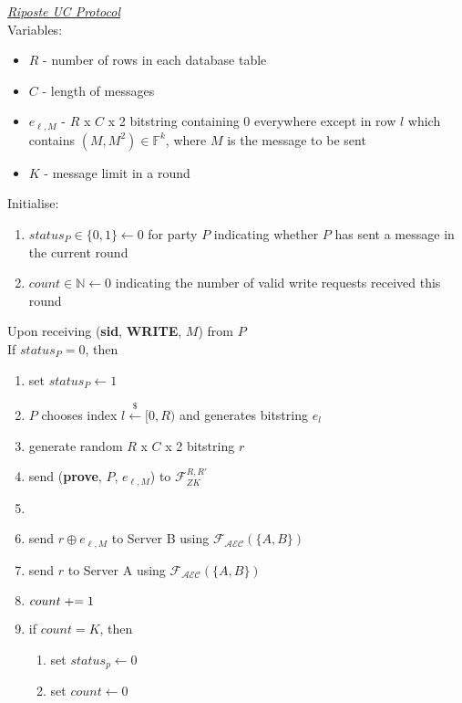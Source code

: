 \begin{tcolorbox}[colback=white, arc=5pt]
\noindent\emph{\underline{Riposte UC Protocol}}\\[5pt]
Variables:
\begin{itemize}
    \item $R$ - number of rows in each database table
    \item $C$ - length of messages
    \item $e_{\ell,M}$ - $R$ x $C$ x 2 bitstring containing 0 everywhere except in row $l$ which contains $(M, M^2)\in \mathbb{F}^k$, where $M$ is the message to be sent
    \item $K$ - message limit in a round
\end{itemize}
 Initialise:
 \begin{enumerate}
     \item $status_P\in\{0,1\}\leftarrow 0$ for party $P$ indicating whether $P$ has sent a message in the current round
     \item $count\in\mathbb{N}\leftarrow 0$ indicating the number of valid write requests received this round
 \end{enumerate}
 
 
\extitem Upon receiving (\textbf{sid}, \textbf{WRITE}, $M$) from $P$\\
If $status_P=0$, then
\begin{enumerate}
    \item set $status_P\leftarrow 1$
    \item $P$ chooses index $l \overset{{\scriptscriptstyle\$}}{\leftarrow} [0,R)$ and generates bitstring $e_l$
    \item generate random $R$ x $C$ x 2 bitstring $r$
    \item send (\textbf{prove}, $P$, $e_{\ell,M}$) to $\mathcal{F}_{ZK}^{R,R'}$
    \item 
    \item send $r\oplus e_{\ell,M}$ to Server B using $\mathcal{F}_{\mathcal{AEC}}(\{A,B\})$
    \item send $r$ to Server A using $\mathcal{F}_{\mathcal{AEC}}(\{A,B\})$
    
    \item $count \mathrel{+}= 1$
    \item if $count=K$, then
    \begin{enumerate}
        \item set $status_p\leftarrow0$
        \item set $count \leftarrow 0$
    \end{enumerate}
\end{enumerate}


\end{tcolorbox}
